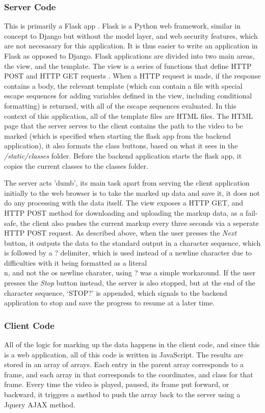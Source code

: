         \subsubsection{Server Code}
        This is primarily a Flask app \cite{flaskpocoo}. Flask is a Python web framework, similar in concept to Django but without the model layer, and web security features, which are not necesasary for this application. It is thus easier to write an application in Flask as opposed to Django. Flask applications are divided into two main areas, the view, and the template. The view is a series of functions that define HTTP POST and HTTP GET requests \cite{fielding1999hypertext}. When a HTTP request is made, if the response contains a body, the relevant template (which can contain a file with special escape sequences for adding variables defined in the view, including conditional formatting) is returned, with all of the escape sequences evaluated. In this context of this application, all of the template files are HTML files. The HTML page that the server serves to the client contains the path to the video to be marked (which is specified when starting the flask app from the backend application), it also formats the class buttons, based on what it sees in the {\slshape /static/classes} folder. Before the backend application starts the flask app, it copies the current classes to the classes folder.
        
        The server acts 'dumb', its main task apart from serving the client application initially to the web browser is to take the marked up data and save it, it does not do any processing with the data itself. The view exposes a HTTP GET, and HTTP POST method for downloading and uploading the markup data, as a fail-safe, the client also pushes the current markup every three seconds via a seperate HTTP POST request. As described above, when the user presses the {\slshape Next} button, it outputs the data to the standard output in a character sequence, which is followed by a ? delimiter, which is used instead of a newline character due to difficulties with it being formatted as a literal \\n, and not the os newline charater, using ? was a simple workaround. If the user presses the {\slshape Stop} button instead, the server is also stopped, but at the end of the character sequence, `STOP?' is appended, which signals to the backend application to stop and save the progress to resume at a later time.

        \subsubsection{Client Code}
        All of the logic for marking up the data happens in the client code, and since this is a web application, all of this code is written in JavaScript. The results are stored in an array of arrays. Each entry in the parent array corresponds to a frame, and each array in that corresponds to the coordinates, and class for that frame. Every time the video is played, paused, its frame put forward, or backward, it triggers a method to push the array back to the server using a Jquery AJAX method.

